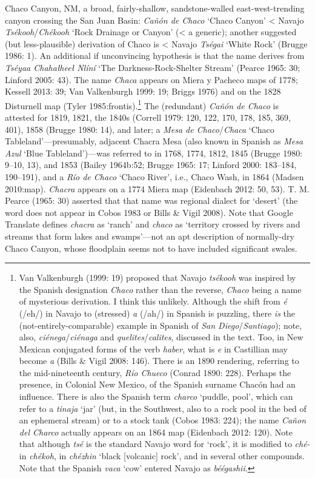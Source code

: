 Chaco Canyon, NM, a broad, fairly-shallow, sandstone-walled east-west-trending canyon crossing the San Juan Basin:  \textit{Cañón de Chaco} ‘Chaco Canyon’ {\textless} Navajo \textit{Tsékooh}/\textit{Chékooh} ‘Rock Drainage or Canyon’ ({\textless} a generic); another suggested (but less-plausible) derivation of Chaco is {\textless} Navajo \textit{Tségai} ‘White Rock’ (Brugge 1986: 1).  An additional if unconvincing hypothesis is that the name derives from \textit{Tséyaa Chahałheeł Nlíní }‘The Darkness-Rock-Shelter Stream’ (Pearce 1965: 30; Linford 2005: 43).  The name \textit{Chaca} appears on Miera y Pacheco maps of 1778; Kessell 2013: 39; Van Valkenburgh 1999: 19; Briggs 1976) and on the 1828 Disturnell map (Tyler 1985:frontis).\footnote{Van Valkenburgh (1999: 19) proposed that Navajo \textit{tsékooh} was inspired by the Spanish designation \textit{Chaco} rather than the reverse, \textit{Chaco} being a name of mysterious derivation.  I think this unlikely.  Although the shift from \textit{é} (/eh/) in Navajo to (stressed) \textit{a} (/ah/) in Spanish is puzzling, there \textit{is} the (not-entirely-comparable) example in Spanish of \textit{San Diego}/\textit{Santiago}); note, also, \textit{ciénega}/\textit{ciénaga} and \textit{quelites}/\textit{calites}, discussed in the text.  Too, in New Mexican conjugated forms of the verb \textit{haber}, what is \textit{e} in Castillian may become \textit{a} (Bills \& Vigil 2008: 146).  There is an 1890 rendering, referring to the mid-nineteenth century, \textit{Río Chueco} (Conrad 1890: 228).  Perhaps the presence, in Colonial New Mexico, of the Spanish surname Chacón had an influence.  There is also the Spanish term \textit{charco} ‘puddle, pool’, which can refer to a \textit{tinaja} ‘jar’ (but, in the Southwest, also to a rock pool in the bed of an ephemeral stream) or to a stock tank (Cobos 1983: 224); the name \textit{Cañon del Charco} actually appears on an 1864 map (Eidenbach 2012: 120).  Note that although \textit{tsé} is the standard Navajo word for ‘rock’, it is modified to \textit{ché-} in \textit{chékoh}, in \textit{chézhin} ‘black [volcanic] rock’, and in several other compounds.  Note that the Spanish \textit{vaca} ‘cow’ entered Navajo as \textit{béégashii}.} The (redundant) \textit{Cañón de Chaco} is attested for 1819, 1821, the 1840s (Correll 1979: 120, 122, 170, 178, 185, 369, 401), 1858 (Brugge 1980: 14), and later; a \textit{Mesa de Chaco}/\textit{Chaca }‘Chaco Tableland’—presumably, adjacent Chacra Mesa (also known in Spanish as \textit{Mesa Azul} ‘Blue Tableland’)—was referred to in 1768, 1774, 1812, 1845 (Brugge 1980: 9–10, 13), and 1853 (Bailey 1964b:52; Brugge 1965: 17; Linford 2000: 183–184, 190–191), and a \textit{Río de Chaco} ‘Chaco River’, i.e., Chaco Wash, in 1864 (Madsen 2010:map).  \textit{Chacra} appears on a 1774 Miera map (Eidenbach 2012: 50, 53).  T. M. Pearce (1965: 30) asserted that that name was regional dialect for ‘desert’ (the word does not appear in Cobos 1983 or Bills \& Vigil 2008).  Note that Google Translate defines \textit{chacra} as ‘ranch’ and \textit{chaco} as ‘territory crossed by rivers and streams that form lakes and swamps’—not an apt description of normally-dry Chaco Canyon, whose floodplain seems not to have included significant swales.

